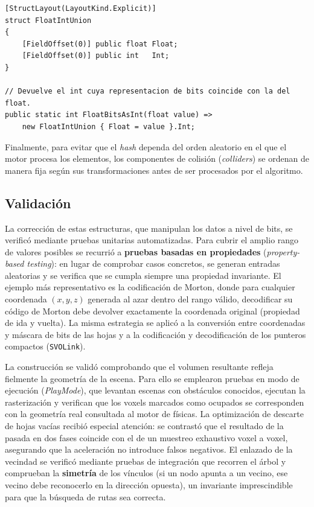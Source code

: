 \begin{lstlisting}[language={[Sharp]C}]
[StructLayout(LayoutKind.Explicit)]
struct FloatIntUnion
{
    [FieldOffset(0)] public float Float;
    [FieldOffset(0)] public int   Int;
}

// Devuelve el int cuya representacion de bits coincide con la del float.
public static int FloatBitsAsInt(float value) =>
    new FloatIntUnion { Float = value }.Int;
\end{lstlisting}

Finalmente, para evitar que el \textit{hash} dependa del orden aleatorio en el que el motor procesa los elementos, los componentes de colisión (\textit{colliders}) se ordenan de manera fija según sus transformaciones antes de ser procesados por el algoritmo.

\subsection{Validación}

La corrección de estas estructuras, que manipulan los datos a nivel de bits, se verificó mediante pruebas unitarias automatizadas.
Para cubrir el amplio rango de valores posibles se recurrió a \textbf{pruebas basadas en propiedades} (\textit{property-based testing}): en lugar de comprobar casos concretos, se generan entradas aleatorias y se verifica que se cumpla siempre una propiedad invariante.
El ejemplo más representativo es la codificación de Morton, donde para cualquier coordenada $(x, y, z)$ generada al azar dentro del rango válido, decodificar su código de Morton debe devolver exactamente la coordenada original (propiedad de ida y vuelta).
La misma estrategia se aplicó a la conversión entre coordenadas y máscara de bits de las hojas y a la codificación y decodificación de los punteros compactos (\texttt{SVOLink}).

La construcción se validó comprobando que el volumen resultante refleja fielmente la geometría de la escena.
Para ello se emplearon pruebas en modo de ejecución (\textit{PlayMode}), que levantan escenas con obstáculos conocidos, ejecutan la rasterización y verifican que los \glspl{voxel} marcados como ocupados se corresponden con la geometría real consultada al motor de físicas.
La optimización de descarte de hojas vacías recibió especial atención: se contrastó que el resultado de la pasada en dos fases coincide con el de un muestreo exhaustivo \gls{voxel} a \gls{voxel}, asegurando que la aceleración no introduce falsos negativos.
El enlazado de la vecindad se verificó mediante pruebas de integración que recorren el árbol y comprueban la \textbf{simetría} de los vínculos (si un nodo apunta a un vecino, ese vecino debe reconocerlo en la dirección opuesta), un invariante imprescindible para que la búsqueda de rutas sea correcta.

